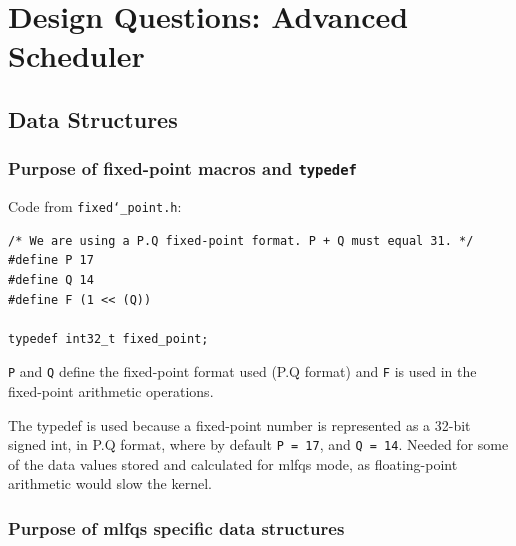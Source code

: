 \documentclass{article}
\renewcommand{\_}{\char`_}
\begin{document}
\newpage

\section{Design Questions: Advanced Scheduler}
\subsection{Data Structures}
\subsubsection{Purpose of fixed-point macros and \texttt{typedef}}

Code from \texttt{fixed\_point.h}: 

\begin{lstlisting}
/* We are using a P.Q fixed-point format. P + Q must equal 31. */
#define P 17
#define Q 14
#define F (1 << (Q))

typedef int32_t fixed_point;

\end{lstlisting}

\texttt{P} and \texttt{Q} define the fixed-point format used (P.Q format) and \texttt{F} is used in the fixed-point arithmetic operations.

The typedef is used because a fixed-point number is represented as a 32-bit signed int, in P.Q format, where by default \texttt{P = 17}, and \texttt{Q = 14}. Needed for some of the data values stored and calculated for mlfqs mode, as floating-point arithmetic would slow the kernel.

\subsubsection{Purpose of mlfqs specific data structures}
\end{document}
